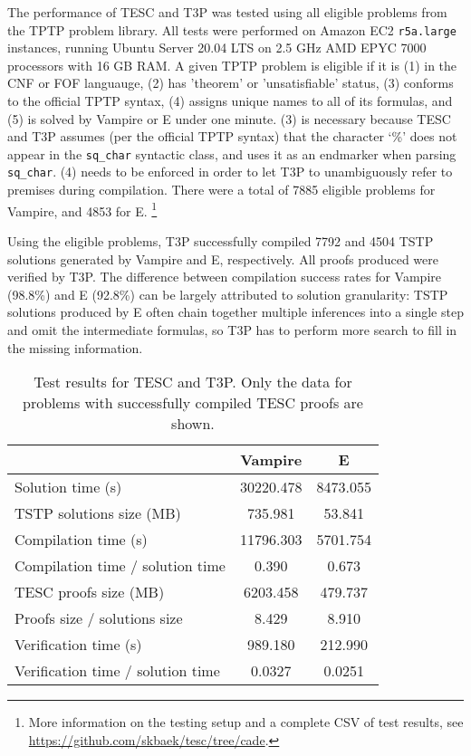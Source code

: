 \documentclass[12pt]{article}
\begin{document}
The performance of TESC and T3P was tested using all eligible problems from the TPTP problem library.
All tests were performed on Amazon EC2 \texttt{r5a.large} instances, running Ubuntu Server 20.04 LTS 
on 2.5 GHz AMD EPYC 7000 processors with 16 GB RAM. 
A given TPTP problem is eligible if it is (1) in the CNF or FOF languauge, (2) has 'theorem' or  
'unsatisfiable' status, (3) conforms to the official TPTP syntax, (4) assigns unique names to all of 
its formulas, and (5) is solved by Vampire or E under one minute. (3) is necessary because  
TESC and T3P assumes (per the official TPTP syntax) that the character `\%' does not appear in the
\verb|sq_char| syntactic class, and uses it as an endmarker when parsing \verb|sq_char|. 
(4) needs to be enforced in order to let T3P to unambiguously refer to premises during compilation.
There were a total of 7885 eligible problems for Vampire, and 4853 for E. \footnote{
  More information on the testing setup and a complete CSV of test results,
  see \url{https://github.com/skbaek/tesc/tree/cade}.
}

Using the eligible problems, T3P successfully compiled 7792 and 4504 TSTP solutions 
generated by Vampire and E, respectively. All proofs produced were verified by T3P.
The difference between compilation success rates for Vampire (98.8\%) and E (92.8\%) 
can be largely attributed to solution granularity: TSTP solutions produced by E often 
chain together multiple inferences into a single step and omit the intermediate formulas, 
so T3P has to perform more search to fill in the missing information. 

\begin{table}[]
  \centering
  \begin{tabular}{l|cc}
                                    & Vampire   & E        \\ \hline
  Solution time (s)                 & 30220.478 & 8473.055 \\ 
  TSTP solutions size (MB)          & 735.981   & 53.841   \\
  Compilation time (s)              & 11796.303 & 5701.754 \\
  Compilation time / solution time  & 0.390     & 0.673    \\
  TESC proofs size (MB)             & 6203.458  & 479.737  \\
  Proofs size / solutions size      & 8.429     & 8.910    \\
  Verification time (s)             & 989.180   & 212.990  \\
  Verification time / solution time & 0.0327    & 0.0251  
  \end{tabular}
  \caption{Test results for TESC and T3P. Only the data for problems with successfully compiled TESC proofs are shown.}
  \label{tab:results}
\end{table}
\end{document}
